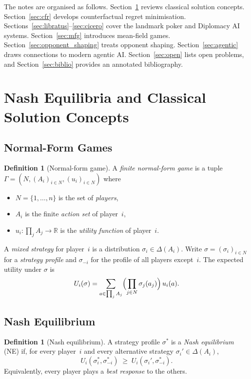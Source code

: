 \documentclass[11pt,a4paper]{article}
\theoremstyle{plain}
\theoremstyle{definition}
\newtheorem{definition}[theorem]{Definition}
\newcommand{\R}{\mathbb{R}}
\begin{document}
The notes are organised as follows.  Section~\ref{sec:nash} reviews
classical solution concepts.  Section~\ref{sec:cfr} develops
counterfactual regret minimisation.
Sections~\ref{sec:libratus}--\ref{sec:cicero} cover the landmark poker
and Diplomacy AI systems.  Section~\ref{sec:mfg} introduces mean-field
games.  Section~\ref{sec:opponent_shaping} treats opponent shaping.
Section~\ref{sec:agentic} draws connections to modern agentic AI.
Section~\ref{sec:open} lists open problems, and
Section~\ref{sec:biblio} provides an annotated bibliography.

\section{Nash Equilibria and Classical Solution Concepts}\label{sec:nash}

\subsection{Normal-Form Games}

\begin{definition}[Normal-form game]
A \emph{finite normal-form game} is a tuple
$\Gamma = (N, (A_i)_{i\in N}, (u_i)_{i\in N})$ where
\begin{itemize}
  \item $N = \{1,\dots,n\}$ is the set of \emph{players},
  \item $A_i$ is the finite \emph{action set} of player~$i$,
  \item $u_i : \prod_{j} A_j \to \R$ is the \emph{utility function} of
    player~$i$.
\end{itemize}
\end{definition}

A \emph{mixed strategy} for player~$i$ is a distribution
$\sigma_i \in \Delta(A_i)$.  Write $\sigma = (\sigma_i)_{i\in N}$ for a
\emph{strategy profile} and $\sigma_{-i}$ for the profile of all players
except~$i$.  The expected utility under $\sigma$ is
\[
  U_i(\sigma)
  = \sum_{a \in \prod_j A_j}
    \Bigl(\prod_{j\in N} \sigma_j(a_j)\Bigr)\, u_i(a).
\]

\subsection{Nash Equilibrium}

\begin{definition}[Nash equilibrium]
A strategy profile $\sigma^*$ is a \emph{Nash equilibrium} (NE) if, for
every player~$i$ and every alternative strategy $\sigma_i' \in
\Delta(A_i)$,
\[
  U_i(\sigma_i^*, \sigma_{-i}^*) \;\geq\; U_i(\sigma_i', \sigma_{-i}^*).
\]
Equivalently, every player plays a \emph{best response} to the others.
\end{definition}
\end{document}
